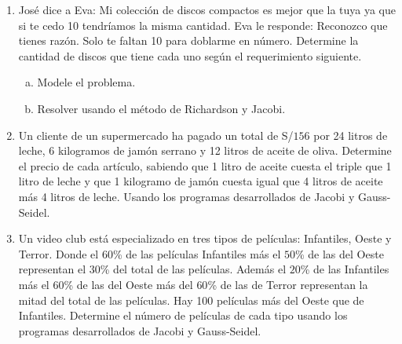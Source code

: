 \documentclass[
	spanish,
	8pt,
	utf8,
	xcolor=table,
	handout,
	aspectratio=169,
	professionalfonts,
	notheorems,
	mathserif,
]{beamer}
\newcounter{savedenum}
\newcommand*{\resume}{\setcounter{enumi}{\thesavedenum}}
\begin{document}
\begin{frame}
	\begin{enumerate}
		\resume

		\item

		      José dice a Eva:
		      Mi colección de discos compactos es mejor que la tuya ya
		      que si te cedo 10 tendríamos la misma cantidad.
		      Eva le responde:
		      Reconozco que tienes razón.
		      Solo te faltan 10 para doblarme en número.
		      Determine la cantidad de discos que tiene cada uno según el
		      requerimiento siguiente.

		      \begin{multicols}{2}
			      \begin{enumerate}[a)]
				      \item

				            Modele el problema.

				      \item

				            Resolver usando el método de Richardson y Jacobi.
			      \end{enumerate}
		      \end{multicols}

		\item

		      Un cliente de un supermercado ha pagado un total de S/$156$
		      por 24 litros de leche, 6 kilogramos de jamón serrano y 12
		      litros de aceite de oliva.
		      Determine el precio de cada artículo, sabiendo que 1 litro
		      de aceite cuesta el triple que 1 litro de leche y que 1
		      kilogramo de jamón cuesta igual que 4 litros de aceite más
		      4 litros de leche.
		      Usando los programas desarrollados de Jacobi y Gauss-Seidel.

		\item

		      Un video club está especializado en tres tipos de
		      películas: Infantiles, Oeste y Terror.
		      Donde el $60$\% de las películas Infantiles más el
		      $50$\% de las del Oeste representan el $30$\% del total de
		      las películas.
		      Además el $20$\% de las Infantiles más el $60$\% de las del
		      Oeste más del $60$\% de las de Terror representan la mitad
		      del total de las películas.
		      Hay 100 películas más del Oeste que de Infantiles.
		      Determine el número de películas de cada tipo usando los
		      programas desarrollados de Jacobi y Gauss-Seidel.


\end{enumerate}
\end{frame}
\end{document}
